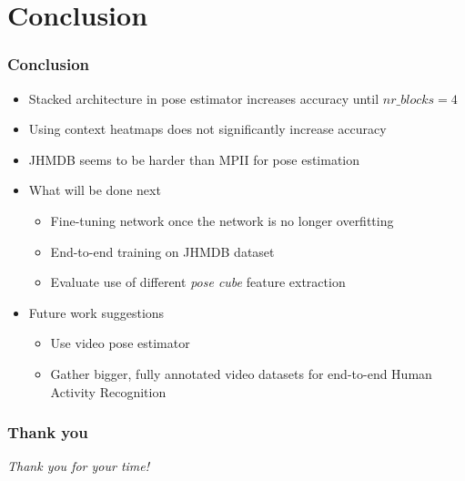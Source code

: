 \documentclass[9pt]{beamer}
\newenvironment{myframe}[1][]{%
\begin{frame}%
\frametitle{#1}
\setcounter{footnote}{0}


}{%
\end{frame}%
}
\begin{document}
\section{Conclusion}
\begin{myframe}[Conclusion]
    \begin{itemize}
        \item Stacked architecture in pose estimator increases accuracy until $nr\_blocks = 4$
        \item Using context heatmaps does not significantly increase accuracy
        \item JHMDB seems to be harder than MPII for pose estimation
        \item What will be done next
        \begin{itemize}
            \item Fine-tuning network once the network is no longer overfitting
            \item End-to-end training on JHMDB dataset
            \item Evaluate use of different \textit{pose cube} feature extraction
        \end{itemize}
        \item Future work suggestions
        \begin{itemize}
            \item Use video pose estimator
            \item Gather bigger, fully annotated video datasets for end-to-end Human Activity Recognition
        \end{itemize}
    \end{itemize}
\end{myframe}

\begin{myframe}[Thank you]
    \centering \Large
    \emph{Thank you for your time!}
\end{myframe}
\end{document}
